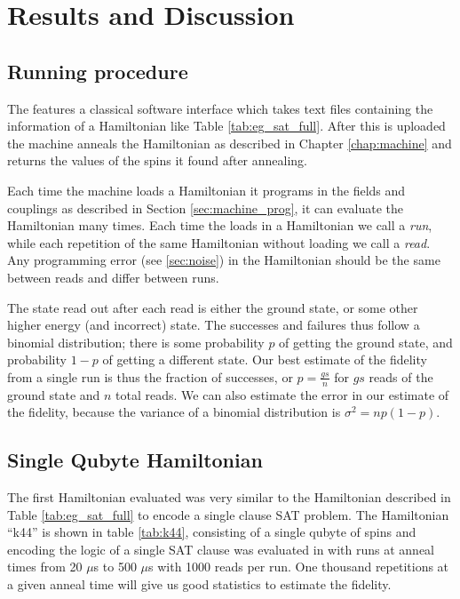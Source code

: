 \chapter{Results and Discussion}

\section{Running procedure}
\label{sec:prog}
The \machine features a classical software interface which takes text files containing the information of a Hamiltonian like Table \ref{tab:eg_sat_full}.  After this is uploaded the machine anneals the Hamiltonian as described in Chapter \ref{chap:machine} and returns the values of the spins it found after annealing.

Each time the machine loads a Hamiltonian it programs in the fields and couplings as described in Section \ref{sec:machine_prog}, it can evaluate the Hamiltonian many times.  Each time the \machine loads in a Hamiltonian we call a \emph{run}, while each repetition of the same Hamiltonian without loading we call a \emph{read}.  Any programming error (see \ref{sec:noise}) in the Hamiltonian should be the same between reads and differ between runs.

The state read out after each read is either the ground state, or some other higher energy (and incorrect) state.  The successes and failures thus follow a binomial distribution; there is some probability $p$ of getting the ground state, and probability $1-p$ of getting a different state.
Our best estimate of the fidelity from a single run is thus the fraction of successes, or $p = \frac{gs}{n}$ for $gs$ reads of the ground state and $n$ total reads.  We can also estimate the error in our estimate of the fidelity, because the variance of a binomial distribution is $\sigma^2 = np(1-p)$.

\section{Single Qubyte Hamiltonian}
The first Hamiltonian evaluated was very similar to the Hamiltonian described in Table \ref{tab:eg_sat_full} to encode a single clause SAT problem.  The Hamiltonian ``k44'' is shown in table \ref{tab:k44}, consisting of a single qubyte of spins and encoding the logic of a single SAT clause was evaluated in with runs at anneal times from 20 $\mu$s to 500 $\mu$s with 1000 reads per run.  One thousand repetitions at a given anneal time will give us good statistics to estimate the fidelity.

